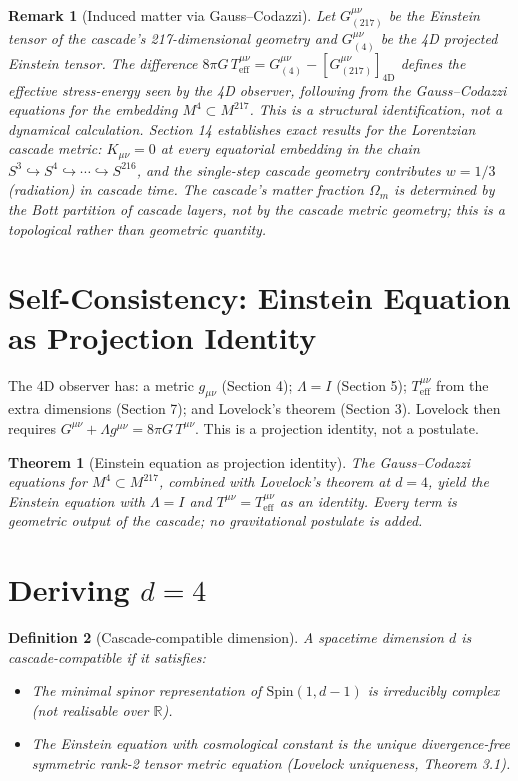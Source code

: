 \documentclass[12pt,a4paper]{article}
\newtheorem{theorem}{Theorem}[section]
\newtheorem{definition}[theorem]{Definition}
\newtheorem*{remark}{Remark}
\begin{document}
\begin{remark}[Induced matter via Gauss--Codazzi]
Let $G^{\mu\nu}_{(217)}$ be the Einstein tensor of
the cascade's 217-dimensional geometry and $G^{\mu\nu}_{(4)}$ be the 4D projected Einstein tensor. The
difference $8\pi G\,T^{\mu\nu}_{\text{eff}} = G^{\mu\nu}_{(4)} - [G^{\mu\nu}_{(217)}]_{\text{4D}}$ defines the effective stress-energy seen by the 4D
observer, following from the Gauss--Codazzi equations for the embedding $M^4 \subset M^{217}$. This
is a structural identification, not a dynamical calculation. Section 14 establishes exact
results for the Lorentzian cascade metric: $K_{\mu\nu} = 0$ at every equatorial embedding in the
chain $S^3 \hookrightarrow S^4 \hookrightarrow \cdots \hookrightarrow S^{216}$, and the single-step cascade geometry contributes $w = 1/3$
(radiation) in cascade time. The cascade's matter fraction $\Omega_m$ is determined by the Bott
partition of cascade layers, not by the cascade metric geometry; this is a topological rather
than geometric quantity.
\end{remark}

\section{Self-Consistency: Einstein Equation as Projection Identity}

The 4D observer has: a metric $g_{\mu\nu}$ (Section 4); $\Lambda = I$ (Section 5); $T^{\mu\nu}_{\text{eff}}$ from the extra
dimensions (Section 7); and Lovelock's theorem (Section 3). Lovelock then requires
$G^{\mu\nu} + \Lambda g^{\mu\nu} = 8\pi G\,T^{\mu\nu}$. This is a projection identity, not a postulate.

\begin{theorem}[Einstein equation as projection identity]
The Gauss--Codazzi equations
for $M^4 \subset M^{217}$, combined with Lovelock's theorem at $d = 4$, yield the Einstein equation
with $\Lambda = I$ and $T^{\mu\nu} = T^{\mu\nu}_{\text{eff}}$ as an identity. Every term is geometric output of the cascade;
no gravitational postulate is added.
\end{theorem}

\section{Deriving $d = 4$}

\begin{definition}[Cascade-compatible dimension]
A spacetime dimension $d$ is cascade-compatible if it satisfies:
\begin{itemize}
\item[(C1)] The minimal spinor representation of $\text{Spin}(1, d - 1)$ is irreducibly complex (not
realisable over $\mathbb{R}$).
\item[(C2)] The Einstein equation with cosmological constant is the unique divergence-free symmetric rank-2 tensor metric equation (Lovelock uniqueness, Theorem 3.1).
\end{itemize}
\end{definition}
\end{document}

